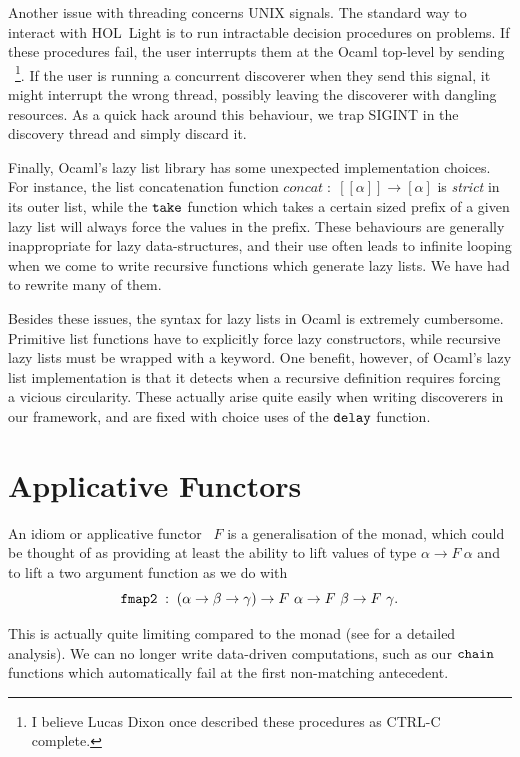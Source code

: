 Another issue with threading concerns UNIX signals. The standard way to interact with HOL~Light is to run intractable decision procedures on problems. If these procedures fail, the user interrupts them at the Ocaml top-level by sending ~\footnote{I believe Lucas Dixon once described these procedures as CTRL-C complete.}. If the user is running a concurrent discoverer when they send this signal, it might interrupt the wrong thread, possibly leaving the discoverer with dangling resources. As a quick hack around this behaviour, we trap SIGINT in the discovery thread and simply discard it.

Finally, Ocaml's lazy list library has some unexpected implementation choices. For instance, the list concatenation function $concat\;:\;[[\alpha]]\rightarrow[\alpha]$ is \emph{strict} in its outer list, while the $\texttt{take}$ function which takes a certain sized prefix of a given lazy list will always force the values in the prefix. These behaviours are generally inappropriate for lazy data-structures, and their use often leads to infinite looping when we come to write recursive functions which generate lazy lists. We have had to rewrite many of them.

Besides these issues, the syntax for lazy lists in Ocaml is extremely cumbersome. Primitive list functions have to explicitly force lazy constructors, while recursive lazy lists must be wrapped with a  keyword. One benefit, however, of Ocaml's lazy list implementation is that it detects when a recursive definition requires forcing a vicious circularity. These actually arise quite easily when writing discoverers in our framework, and are fixed with choice uses of the $\texttt{delay}$ function.

\section{Applicative Functors}\label{sec:Applicative}
An idiom or applicative functor~\cite{Applicative} $F$ is a generalisation of the monad, which could be thought of as providing at least the ability to lift values of type $\alpha \rightarrow F\ \alpha$ and to lift a two argument function as we do with 
\begin{displaymath}
\texttt{fmap2}\;:\;(\alpha\rightarrow\beta\rightarrow\gamma)\rightarrow F\ \alpha \rightarrow F\ \beta \rightarrow F\ \gamma.
\end{displaymath}

This is actually quite limiting compared to the monad (see \cite{IdiomsArrowsMonads} for a detailed analysis). We can no longer write data-driven computations, such as our $\texttt{chain}$ functions which automatically fail at the first non-matching antecedent.

